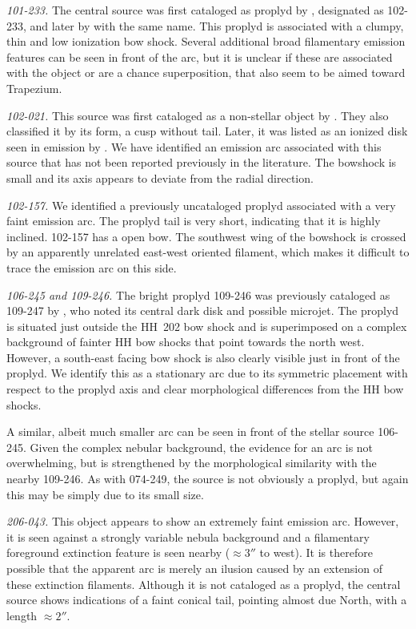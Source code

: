 \documentclass[apj, twocolumn]{aastex63}
\begin{document}
\textit{101-233.} The central source was first cataloged
as proplyd by \citet{ODell:1996a}, designated as 102-233,
and later by \citet{Ricci:2008a} with the same name. This
proplyd is associated with a clumpy, thin and low ionization
bow shock. Several additional broad filamentary emission
features can be seen in front of the arc, but it is unclear
if these are associated with the object or are a chance
superposition, that also seem to be aimed toward Trapezium. 

\textit{102-021.} This source was first cataloged as a non-stellar
object by \citet{ODell:1996a}. They also classified it by its form,
a cusp without tail. Later, it was listed as an ionized disk seen
in emission by \citet{Ricci:2008a}. We have identified an emission
arc associated with this source that has not been reported previously
in the literature. The  bowshock is small and its axis appears to
deviate from the radial direction. 

\textit{102-157.} We identified a previously uncataloged
proplyd associated with a very faint emission arc. The proplyd
tail is very short, indicating that it is highly inclined.
102-157 has a open bow. The southwest wing of the bowshock
is crossed by an apparently unrelated east-west oriented
filament, which makes it difficult to trace the emission
arc on this side.


\textit{106-245 and 109-246.} The bright proplyd 109-246
\citep{Ricci:2008a} was previously cataloged as 109-247 by
\citet{Bally:2000a}, who noted its central dark disk and
possible microjet.  The proplyd is situated just outside
the HH~202 bow shock and is superimposed on a complex
background of fainter HH bow shocks that point towards
the north west.  However, a south-east facing bow shock
is also clearly visible just in front of
the proplyd.  We identify this as a stationary arc due to its
symmetric placement with respect to the proplyd axis and clear
morphological differences from the HH bow shocks.

A similar, albeit much smaller arc can be seen in front of the
stellar source 106-245.  Given the complex nebular background,
the evidence for an arc is not overwhelming, but is strengthened
by the morphological similarity with the nearby 109-246.  As
with 074-249, the source is not obviously a proplyd, but again
this may be simply due to its small size.    


\textit{206-043.} This object appears to show an extremely faint
emission arc.  However, it is seen against a strongly variable nebula
background and a filamentary foreground extinction feature is seen
nearby (\(\approx 3''\) to west).  It is therefore possible that
the apparent arc is merely an ilusion caused by an extension of these
extinction filaments.  Although it is not cataloged as a proplyd, the
central source shows indications of a faint conical tail, pointing
almost due North, with a length \(\approx 2''\). 
\end{document}

